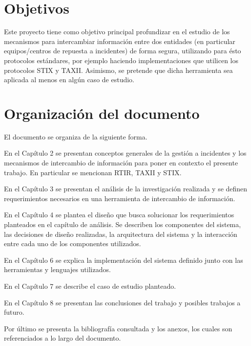 \section{Objetivos}
\label{capitulo1:objetivos}
Este proyecto tiene como objetivo principal profundizar en el estudio de los mecanismos para intercambiar información entre dos entidades (en particular equipos/centros de repuesta a incidentes) de forma segura, utilizando para ésto protocolos estándares, por ejemplo haciendo implementaciones que utilicen  los protocolos STIX y TAXII. Asimismo, se pretende que dicha herramienta sea aplicada al menos en algún caso de estudio.

\section{Organización del documento}
\label{capitulo1:organizacion}
El documento se organiza de la siguiente forma.

En el Capítulo 2 se presentan conceptos generales de la gestión a incidentes y los mecanismos de intercambio de información para poner en contexto el presente trabajo. En particular se mencionan RTIR, TAXII y STIX.

En el Capítulo 3 se presentan el análisis de la investigación realizada y se definen requerimientos necesarios en una herramienta de intercambio de información.

En el Capítulo 4 se plantea el diseño que busca solucionar los requerimientos planteados en el capítulo de análisis. Se describen los componentes del sistema, las decisiones de diseño realizadas, la arquitectura del sistema y la interacción entre cada uno de los componentes utilizados.

En el Capítulo 6 se explica la implementación del sistema definido junto con las herramientas y lenguajes utilizados.

En el Capítulo 7 se describe el caso de estudio planteado.

En el Capítulo 8 se presentan las conclusiones del trabajo y posibles trabajos a futuro.

Por último se presenta la bibliografía consultada y los anexos, los cuales son referenciados a lo largo del documento.
